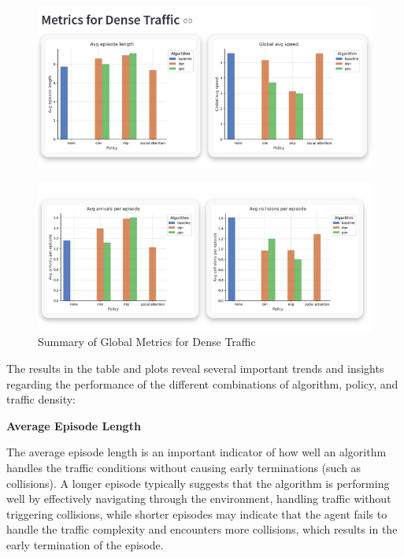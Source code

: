 \begin{figure}[H]
    \centering
    \includegraphics[height=0.215\textheight]{images/app_global_plots_dense1.png} 
\end{figure}

\begin{figure}[H]
    \centering
    \includegraphics[height=0.2\textheight]{images/app_global_plots_dense2.png} 
    \caption{Summary of Global Metrics for Dense Traffic}
\end{figure}

The results in the table and plots reveal several important trends and insights regarding the performance of the different combinations of algorithm, policy, and traffic density:

\textbf{Average Episode Length}

The average episode length is an important indicator of how well an algorithm handles the traffic conditions without causing early terminations (such as collisions). A longer episode typically suggests that the algorithm is performing well by effectively navigating through the environment, handling traffic without triggering collisions, while shorter episodes may indicate that the agent fails to handle the traffic complexity and encounters more collisions, which results in the early termination of the episode.

